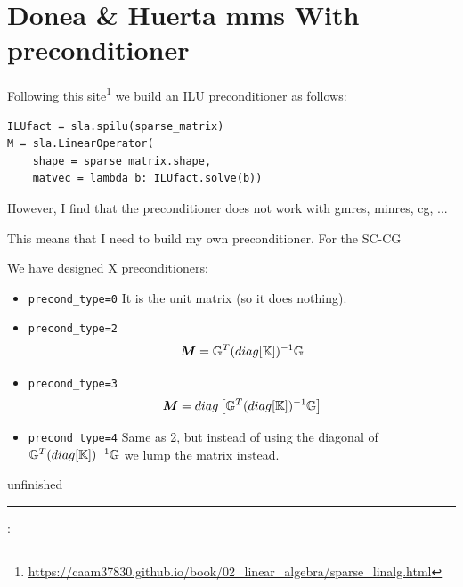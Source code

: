 \section*{Donea \& Huerta mms With preconditioner}

Following this site\footnote{\url{https://caam37830.github.io/book/02_linear_algebra/sparse_linalg.html}}
we build an ILU preconditioner as follows:
\begin{lstlisting}
ILUfact = sla.spilu(sparse_matrix)
M = sla.LinearOperator(
    shape = sparse_matrix.shape,
    matvec = lambda b: ILUfact.solve(b))
\end{lstlisting}
However, I find that the preconditioner does not work with gmres, minres, cg, ...

This means that I need to build my own preconditioner. 
For the SC-CG 

We have designed X preconditioners:
\begin{itemize}
\item {\tt precond\_type=0} It is the unit matrix (so it does nothing). 

\item {\tt precond\_type=2}
\[
{\bm M} = {\mathbb{G}}^T (diag [{\mathbb{K}}]  )^{-1} {\mathbb{G}} 
\]
\item {\tt precond\_type=3} 
\[
{\bm M} = diag \left[ {\mathbb{G}}^T (diag [{\mathbb{K}}]  )^{-1} {\mathbb{G}} \right]
\]
\item {\tt precond\_type=4} Same as 2, but instead of using the 
diagonal of $ {\mathbb{G}}^T (diag [{\mathbb{K}}]  )^{-1} {\mathbb{G}}$ we lump the matrix instead.

\end{itemize}

{\Large unfinished}



\par\noindent\rule{\textwidth}{0.4pt}

\vspace{.5cm}

\begin{center}
\end{center}

\vspace{.5cm}

\Literature:\\








